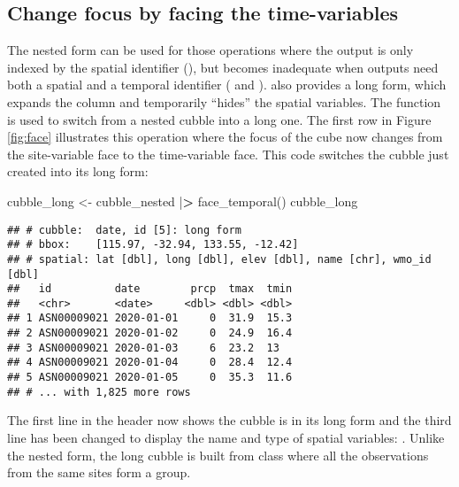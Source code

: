 \documentclass{article}
\newenvironment{Shaded}{\begin{snugshade}}{\end{snugshade}}
\newcommand{\ErrorTok}[1]{\textcolor[rgb]{0.64,0.00,0.00}{\textbf{#1}}}
\newcommand{\FunctionTok}[1]{\textcolor[rgb]{0.00,0.00,0.00}{#1}}
\newcommand{\NormalTok}[1]{#1}
\newcommand{\OtherTok}[1]{\textcolor[rgb]{0.56,0.35,0.01}{#1}}
\newcommand{\SpecialCharTok}[1]{\textcolor[rgb]{0.00,0.00,0.00}{#1}}
\begin{document}
\hypertarget{change-focus-by-facing-the-time-variables}{%
\subsection{Change focus by facing the time-variables}\label{change-focus-by-facing-the-time-variables}}

The nested form can be used for those operations where the output is only indexed by the spatial identifier (), but becomes inadequate when outputs need both a spatial and a temporal identifier ( and ).  also provides a long form, which expands the  column and temporarily ``hides'' the spatial variables. The function  is used to switch from a nested cubble into a long one. The first row in Figure \ref{fig:face} illustrates this operation where the focus of the cube now changes from the site-variable face to the time-variable face. This code switches the cubble just created into its long form:

\begin{Shaded}
\begin{Highlighting}[]
\NormalTok{cubble\_long }\OtherTok{\textless{}{-}}\NormalTok{ cubble\_nested }\SpecialCharTok{|}\ErrorTok{\textgreater{}} \FunctionTok{face\_temporal}\NormalTok{()}
\NormalTok{cubble\_long}
\end{Highlighting}
\end{Shaded}

\begin{verbatim}
## # cubble:  date, id [5]: long form
## # bbox:    [115.97, -32.94, 133.55, -12.42]
## # spatial: lat [dbl], long [dbl], elev [dbl], name [chr], wmo_id [dbl]
##   id          date        prcp  tmax  tmin
##   <chr>       <date>     <dbl> <dbl> <dbl>
## 1 ASN00009021 2020-01-01     0  31.9  15.3
## 2 ASN00009021 2020-01-02     0  24.9  16.4
## 3 ASN00009021 2020-01-03     6  23.2  13  
## 4 ASN00009021 2020-01-04     0  28.4  12.4
## 5 ASN00009021 2020-01-05     0  35.3  11.6
## # ... with 1,825 more rows
\end{verbatim}

The first line in the header now shows the cubble is in its long form and the third line has been changed to display the name and type of spatial variables: . Unlike the nested form, the long cubble is built from class  where all the observations from the same sites form a group.
\end{document}
